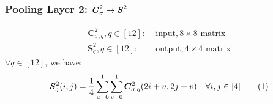 \documentclass[12pt]{article}
\newcommand\numberthis{\stepcounter{equation}\tag{\theequation}}
\begin{document}
\subsubsection{Pooling Layer 2: $\textbf{\textit{C}}^2_\sigma \rightarrow \textbf{\textit{S}}^2$}
\begin{align*}
    \bm{C}^2_{\sigma, q}, q \in [12]:& \text{ input}, 8 \times 8 \text{ matrix}\\
    \bm{S}^2_q, q \in [12]:& \text{ output}, 4 \times 4 \text{ matrix}
\end{align*}
$\forall q \in [12]$, we have:
\begin{align*}
    \bm{S}^2_q(i, j) = \frac{1}{4}\sum_{u = 0}^1\sum_{v = 0}^1\bm{C}^2_{\sigma, q}(2i + u, 2j + v) \quad \forall i, j \in [4]
    \numberthis \label{S2}
\end{align*}
\end{document}

